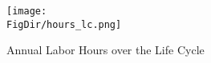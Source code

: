\begin{figure}[ht]
  \centerline{
    \texttt{[image: \\FigDir/hours\_lc.png]}
  }
  \caption{Annual Labor Hours over the Life Cycle} \label{fig:hours_lc}
\end{figure}
